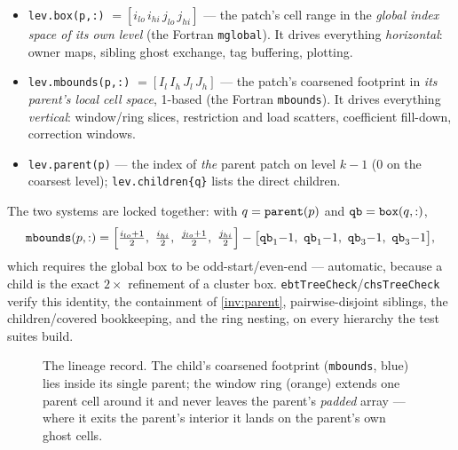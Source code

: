 \documentclass[11pt,oneside,openany]{book}
\newcommand{\code}[1]{\textnormal{\texttt{#1}}}
\begin{document}
\begin{itemize}[leftmargin=2em]
\item \code{lev.box(p,:)} $= [i_{lo}\, i_{hi}\, j_{lo}\, j_{hi}]$ ---
the patch's cell range in the \emph{global index space of its own
level} (the Fortran \code{mglobal}).  It drives everything
\emph{horizontal}: owner maps, sibling ghost exchange, tag buffering,
plotting.
\item \code{lev.mbounds(p,:)} $= [I_l\, I_h\, J_l\, J_h]$ --- the
patch's coarsened footprint in \emph{its parent's local cell space},
1-based (the Fortran \code{mbounds}).  It drives everything
\emph{vertical}: window/ring slices, restriction and load scatters,
coefficient fill-down, correction windows.
\item \code{lev.parent(p)} --- the index of \emph{the} parent patch on
level $k{-}1$ ($0$ on the coarsest level); \code{lev.children\{q\}}
lists the direct children.
\end{itemize}

The two systems are locked together: with $q=\code{parent}(p)$ and
$\code{qb}=\code{box}(q,:)$,
\[
\code{mbounds}(p,:) =
\Bigl[\tfrac{i_{lo}+1}{2},\ \tfrac{i_{hi}}{2},\
      \tfrac{j_{lo}+1}{2},\ \tfrac{j_{hi}}{2}\Bigr]
- \bigl[\code{qb}_1{-}1,\ \code{qb}_1{-}1,\ \code{qb}_3{-}1,\
        \code{qb}_3{-}1\bigr],
\]
which requires the global box to be odd-start/even-end --- automatic,
because a child is the exact $2\times$ refinement of a cluster box.
\code{ebtTreeCheck}/\code{chsTreeCheck} verify this identity, the
containment of \cref{inv:parent}, pairwise-disjoint siblings, the
children/covered bookkeeping, and the ring nesting, on every hierarchy
the test suites build.

\begin{figure}[H]
\centering
{}
\caption{The lineage record.  The child's coarsened footprint
(\code{mbounds}, blue) lies inside its single parent; the window ring
(orange) extends one parent cell around it and never leaves the
parent's \emph{padded} array --- where it exits the parent's interior
it lands on the parent's own ghost cells.}
\label{fig:coords}
\end{figure}
\end{document}
